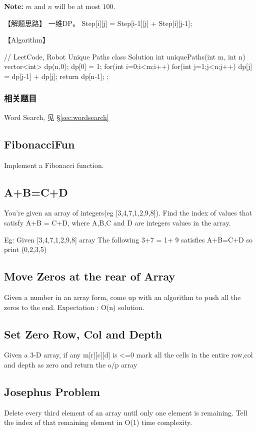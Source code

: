 {\bf Note:} $m$ and $n$ will be at most $100$.

【解题思路】
一维DP。 Step[i][j] = Step[i-1][j] + Step[i][j-1];

【Algorithm】
\begin{Code}
	// LeetCode, Robot Unique Paths
	class Solution {
		int uniquePaths(int m, int n) {
			vector<int> dp(n,0);
			dp[0] = 1;
			for(int i=0;i<m;i++){
				for(int j=1;j<n;j++)
					dp[j] = dp[j-1] + dp[j];
			}
			return dp[n-1];
		}
	};
\end{Code}


\subsubsection{相关题目}

\begindot
\item Word Search, 见 \S \ref{sec:wordsearch}
\myenddot

\subsection{FibonacciFun}
Implement a Fibonacci function.

\subsection{A+B=C+D}
You're given an array of integers(eg [3,4,7,1,2,9,8]). Find the index of values that satisfy A+B = C+D, where A,B,C and D are integers values in the array.

Eg: Given [3,4,7,1,2,9,8] array
The following
3+7 = 1+ 9 satisfies A+B=C+D
so print (0,2,3,5)

\subsection{Move Zeros at the rear of Array}
Given a number in an array form, come up with an algorithm to push all the zeros to the end.
Expectation : O(n) solution.

\subsection{Set Zero Row, Col and Depth}
Given a 3-D array, if any m[r][c][d] is <=0 mark all the cells in the entire row,col and depth as zero and return the o/p array

\subsection{Josephus Problem}
Delete every third element of an array until only one element is remaining. Tell the index of that remaining element in O(1) time complexity.

